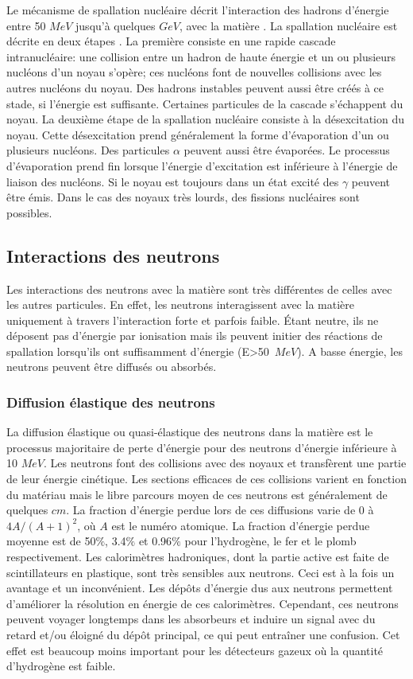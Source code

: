 Le mécanisme de spallation nucléaire décrit l'interaction des hadrons d'énergie entre 50 $MeV$ jusqu'à quelques $GeV$, avec la matière . La spallation nucléaire est décrite en deux étapes \cite{wigmans}. La première consiste en une rapide cascade intranucléaire: une collision entre un hadron de haute énergie et un ou plusieurs nucléons d'un noyau s'opère; ces nucléons font de nouvelles collisions avec les autres nucléons du noyau. Des hadrons instables peuvent aussi être créés à ce stade, si l'énergie est suffisante. Certaines particules de la cascade s'échappent du noyau. La deuxième étape de la spallation nucléaire consiste à la désexcitation du noyau. Cette désexcitation prend généralement la forme d'évaporation d'un ou plusieurs nucléons. Des particules $\alpha$ peuvent aussi être évaporées. Le processus d'évaporation prend fin lorsque l'énergie d'excitation est inférieure à l'énergie de liaison des nucléons. Si le noyau est toujours dans un état excité des $\gamma$ peuvent être émis. Dans le cas des noyaux très lourds, des fissions nucléaires sont possibles.
\subsection{Interactions des neutrons}
Les interactions des neutrons avec la matière sont très différentes de celles avec les autres particules. En effet, les neutrons interagissent avec la matière uniquement à travers l'interaction forte et parfois faible. Étant neutre, ils ne déposent pas d'énergie par ionisation mais ils peuvent initier des réactions de spallation lorsqu'ils ont suffisamment d'énergie (E>50~$MeV$). A basse énergie, les neutrons peuvent être diffusés ou absorbés.
\subsubsection{Diffusion élastique des neutrons}
La diffusion élastique ou quasi-élastique des neutrons dans la matière est le processus majoritaire de perte d'énergie pour des neutrons d'énergie inférieure à 10 $MeV$. Les neutrons font des collisions avec des noyaux et transfèrent une partie de leur énergie cinétique. Les sections efficaces de ces collisions varient en fonction du matériau mais le libre parcours moyen de ces neutrons est généralement de quelques $cm$. La fraction d'énergie perdue lors de ces diffusions varie de 0 à $4A/(A+1)^2$, où $A$ est le numéro atomique. La fraction d'énergie perdue moyenne est de 50$\%$, 3.4$\%$ et 0.96$\%$ pour l'hydrogène, le fer et le plomb respectivement. Les calorimètres hadroniques, dont la partie active est faite de scintillateurs en plastique, sont très sensibles aux neutrons. Ceci est à la fois un avantage et un inconvénient. Les dépôts d'énergie dus aux neutrons permettent d'améliorer la résolution en énergie de ces calorimètres. Cependant, ces neutrons peuvent voyager longtemps dans les absorbeurs et induire un signal avec du retard et/ou éloigné du dépôt principal, ce qui peut entraîner une confusion. Cet effet est beaucoup moins important pour les détecteurs gazeux où la quantité d'hydrogène est faible.
